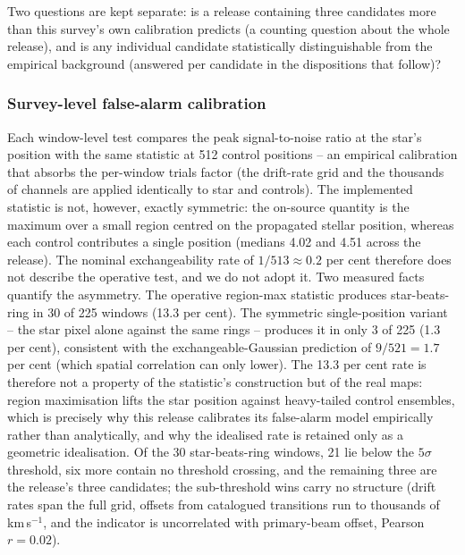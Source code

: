 \documentclass{openjournal}
\begin{document}
Two questions are kept separate: is a release containing three
candidates more than this survey's own calibration predicts (a
counting question about the whole release), and is any individual
candidate statistically distinguishable from the empirical background
(answered per candidate in the dispositions that follow)?

\subsubsection*{Survey-level false-alarm calibration}

Each window-level test compares the peak signal-to-noise ratio at the
star's position with the same statistic at 512 control positions --
an empirical calibration that absorbs the per-window trials factor
(the drift-rate grid and the thousands of channels are applied
identically to star and controls). The implemented statistic is not,
however, exactly symmetric: the on-source quantity is the maximum over
a small region centred on the propagated stellar position, whereas
each control contributes a single position (medians 4.02 and 4.51
across the release). The nominal exchangeability rate of
$1/513\approx0.2$ per cent therefore does not describe the operative
test, and we do not adopt it. Two measured facts quantify the
asymmetry. The operative region-max statistic produces
star-beats-ring in 30 of 225 windows (13.3 per cent). The symmetric
single-position variant -- the star pixel alone against the same
rings -- produces it in only 3 of 225 (1.3 per cent), consistent with
the exchangeable-Gaussian prediction of $9/521=1.7$ per cent (which
spatial correlation can only lower). The 13.3 per cent rate is
therefore not a property of the statistic's construction but of the
real maps: region maximisation lifts the star position against
heavy-tailed control ensembles, which is precisely why this release
calibrates its false-alarm model empirically rather than
analytically, and why the idealised rate is retained only as a
geometric idealisation. Of the 30 star-beats-ring windows, 21 lie
below the $5\sigma$ threshold, six more contain no threshold
crossing, and the remaining three are the release's three candidates;
the sub-threshold wins carry no structure (drift rates span the full
grid, offsets from catalogued transitions run to thousands of
km\,s$^{-1}$, and the indicator is uncorrelated with primary-beam
offset, Pearson $r=0.02$).
\end{document}
